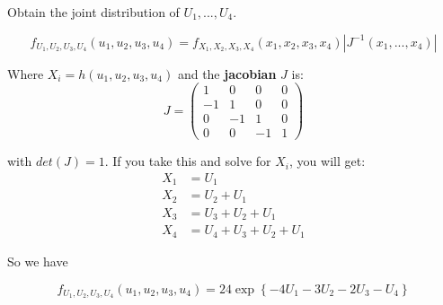 \documentclass{article}
\begin{document}
Obtain the joint distribution of $U_1,...,U_4$.

\begin{equation*}
    f_{U_1,U_2,U_3,U_4} (u_1, u_2, u_3, u_4) = f_{X_1, X_2, X_3, X_4} (x_1, x_2, x_3, x_4) |J^{-1}(x_1,...,x_4)|
\end{equation*}

Where $X_i = h(u_1,u_2,u_3,u_4)$ and the \textbf{jacobian} $J$ is:
\begin{equation*}
    J = \begin{pmatrix}
        1 & 0 & 0 & 0\\
        -1 & 1 & 0 & 0\\
        0 & -1 & 1 & 0\\
        0 & 0 & -1 & 1
    \end{pmatrix}
\end{equation*}

with $det(J) = 1$. If you take this and solve for $X_i$, you will get:
\begin{equation*}
    \begin{split}
        X_1 &= U_1 \\
        X_2 &= U_2 + U_1\\
        X_3 &= U_3 + U_2 + U_1\\
        X_4 &= U_4 + U_3 + U_2 + U_1
    \end{split}
\end{equation*}

So we have

\begin{equation*}
    f_{U_1, U_2, U_3, U_4} (u_1, u_2, u_3, u_4) = 24 \exp \left\{-4 U_1 - 3 U_2 - 2 U_3 - U_4  \right\}
\end{equation*}
\end{document}
